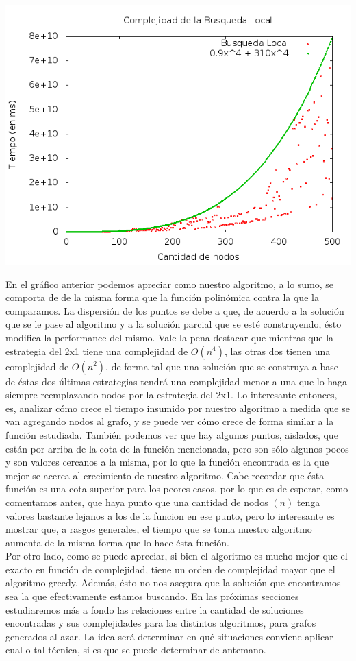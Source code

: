 \begin{center}
\includegraphics[width=17cm]{./graficos/complejidadLocal.png}
\end{center}

En el gráfico anterior podemos apreciar como nuestro algoritmo, a lo sumo, se comporta de de la misma forma que la función polinómica contra la que la comparamos. La dispersión de los puntos se debe a que, de acuerdo a la solución que se le pase al algoritmo y a la solución parcial que se esté construyendo, ésto modifica la performance del mismo. Vale la pena destacar que mientras que la estrategia del 2x1 tiene una complejidad de $O(n^4)$, las otras dos tienen una complejidad de $O(n^2)$, de forma tal que una solución que se construya a base de éstas dos últimas estrategias tendrá una complejidad menor a una que lo haga siempre reemplazando nodos por la estrategia del 2x1. Lo interesante entonces, es, analizar cómo crece el tiempo insumido por nuestro algoritmo a medida que se van agregando nodos al grafo, y se puede ver cómo crece de forma similar a la función estudiada. También podemos ver que hay algunos puntos, aislados, que están por arriba de la cota de la función mencionada, pero son sólo algunos pocos y son valores cercanos a la misma, por lo que la función encontrada es la que mejor se acerca al crecimiento de nuestro algoritmo. Cabe recordar que ésta función es una cota superior para los peores casos, por lo que es de esperar, como comentamos antes, que haya punto que una cantidad de nodos $(n)$ tenga valores bastante lejanos a los de la funcion en ese punto, pero lo interesante es mostrar que, a rasgos generales, el tiempo que se toma nuestro algoritmo aumenta de la misma forma que lo hace ésta función.\\
Por otro lado, como se puede apreciar, si bien el algoritmo es mucho mejor que el exacto en función de complejidad, tiene un orden de complejidad mayor que el algoritmo greedy. Además, ésto no nos asegura que la solución que encontramos sea la que efectivamente estamos buscando. En las próximas secciones estudiaremos más a fondo las relaciones entre la cantidad de soluciones encontradas y sus complejidades para las distintos algoritmos, para grafos generados al azar. La idea será determinar en qué situaciones conviene aplicar cual o tal técnica, si es que se puede determinar de antemano.
